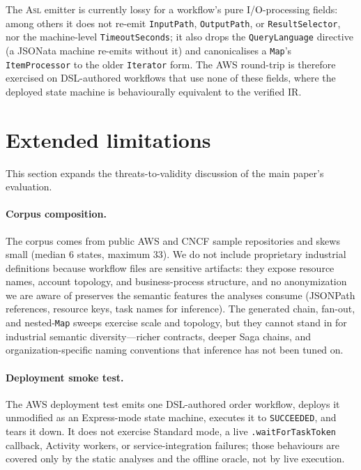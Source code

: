 \documentclass[11pt]{article}
\newcommand{\asl}{\textsc{Asl}}
\theoremstyle{plain}
\theoremstyle{definition}
\theoremstyle{remark}
\begin{document}
The \asl{} emitter is currently lossy for a workflow's pure I/O-processing fields: among others
it does not re-emit \texttt{InputPath}, \texttt{OutputPath}, or \texttt{ResultSelector}, nor the
machine-level \texttt{TimeoutSeconds}; it also drops the \texttt{QueryLanguage} directive (a
JSONata machine re-emits without it) and canonicalises a \texttt{Map}'s \texttt{ItemProcessor} to
the older \texttt{Iterator} form. The AWS round-trip is therefore exercised on DSL-authored
workflows that use none of these fields, where the deployed state machine is behaviourally
equivalent to the verified IR.

\section{Extended limitations}
\label{sec:tr:limits}

This section expands the threats-to-validity discussion of the main paper's evaluation.

\paragraph{Corpus composition.}
The corpus comes from public AWS and CNCF sample repositories and skews small (median 6 states,
maximum 33). We do not include proprietary industrial definitions because workflow files are
sensitive artifacts: they expose resource names, account topology, and business-process
structure, and no anonymization we are aware of preserves the semantic features the analyses
consume (JSONPath references, resource keys, task names for inference). The generated chain,
fan-out, and nested-\texttt{Map} sweeps exercise scale and topology, but they cannot stand in
for industrial semantic diversity---richer contracts, deeper Saga chains, and organization-specific
naming conventions that inference has not been tuned on.

\paragraph{Deployment smoke test.}
The AWS deployment test emits one DSL-authored order workflow, deploys it unmodified as an
Express-mode state machine, executes it to \texttt{SUCCEEDED}, and tears it down. It does not
exercise Standard mode, a live \texttt{.waitForTaskToken} callback, Activity workers, or
service-integration failures; those behaviours are covered only by the static analyses and the
offline oracle, not by live execution.
\end{document}
